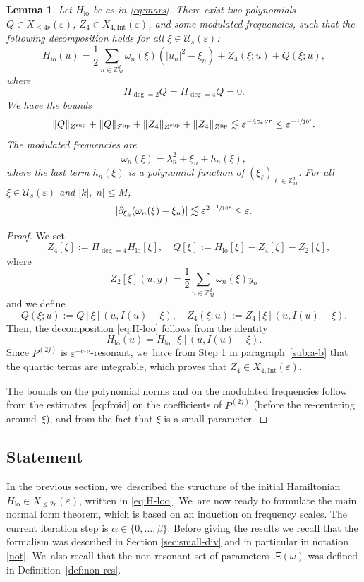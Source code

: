 \documentclass[JEP,XML,SOM,Unicode,published]{cedram}
\theoremstyle{plain}
\newtheorem{lemma}[theorem]{Lemma}
\theoremstyle{definition}
\DeclareMathOperator{\lo}{lo}
\newcommand{\Z}{\mathbb{Z}}
\newcommand{\1}{\mathbf{1}}
\let\epsilon\varepsilon
\begin{document}
\begin{lemma} Let $H_{\lo}$ be as in \eqref{eq:mars}. There exist two polynomials $Q\in X_{\leq 4r}(\epsilon)$, $Z_{4}\in X_{4,\mathrm{Int}}(\epsilon)$, and some modulated frequencies, such that the following decomposition holds for all $\xi\in\mathcal{U}_{s}(\epsilon)$:
\begin{equation}
\label{eq:H-loo}
H_{\lo}(u) = \frac{1}{2}\sum_{n\in\Z_{M}^{d}}\omega_{n}(\xi)(|u_n|^{2}-\xi_{n}
)
+ Z_{4}(\xi;u)
+ Q(\xi;u),
\end{equation}
where
\[
\Pi_{\deg=2}Q = \Pi_{\deg=4}Q=0.
\]
We have the bounds
\[
\|Q\|_{Z^{\mathrm{sup}}}
+\|Q\|_{Z^{\mathrm{lip}}}
+
\|Z_{4}\|_{Z^{\mathrm{sup}}}
+\|Z_{4}\|_{Z^{\mathrm{lip}}}
\lesssim \epsilon^{-4c_{\ast}\nu r} \leq \epsilon^{-\sfrac{1}{10^{4}}}.
\]
The modulated frequencies are
\[
\omega_{n}(\xi) = \lambda_{n}^{2} +\xi_{n}+h_{n}(\xi),
\]
where the last term $h_{n}(\xi)$ is a polynomial function of $(\xi_{\ell})_{\ell\in\Z_{M}^{d}}$. For all $\xi\in\mathcal{U}_{s}(\epsilon)$ and $|k|,|n|\leq M$,
\[
|\partial_{\xi_{k}}(\omega_{n}(\xi)-\xi_{n})| \lesssim \epsilon^{2-\sfrac{1}{10^{4}}} \leq \epsilon.
\]
\end{lemma}
\begin{proof}
We set
\[
\quad Z_{4}[\xi]:= \Pi_{\deg=4}H_{\lo}[\xi],\quad Q[\xi] := H_{\lo}[\xi] - Z_{4}[\xi] - Z_{2}[\xi],
\]
where
\[
Z_{2}[\xi](u,y) = \frac{1}{2}\sum_{n\in\Z_{M}^{d}}\omega_{n}(\xi)y_{n}
\]
and we define
\[
Q(\xi;u):= Q[\xi](u,I(u)-\xi),\quad Z_{4}(\xi;u):= Z_{4}[\xi](u,I(u)-\xi).
\]
Then, the decomposition \eqref{eq:H-loo} follows from the identity
\[
H_{\lo}(u) = H_{\lo}[\xi](u,I(u)-\xi).
\]
Since $P^{(2j)}$ is $\epsilon^{-c_{\ast}\nu}$-resonant, we~have from Step 1 in paragraph~\ref{sub:a-b} that the quartic terms are integrable, which proves that $Z_{4}\in X_{4,\mathrm{Int}}(\epsilon)$.

The bounds on the polynomial norms and on the modulated frequencies follow from the estimates~\eqref{eq:froid} on the coefficients of $P^{(2j)}$ (before the re-centering around~$\xi$), and from the fact that $\xi$ is a small parameter.
\end{proof}

\subsection{Statement}

In the previous section, we~described the structure of the initial Hamiltonian $H_{\lo}\in X_{\leq2r}(\epsilon)$, written in \eqref{eq:H-loo}. We~are now ready to formulate the main normal form theorem, which is based on an induction on frequency scales. The current iteration step is $\alpha\in\{0,\dots,\beta\}$. Before giving the results we recall that the formalism was described in Section \ref{sec:small-div} and in particular in notation \ref{not}. We~also recall that the non-resonant set of parameters~$\Xi(\omega)$ was defined in Definition~\ref{def:non-res}.
\end{document}
